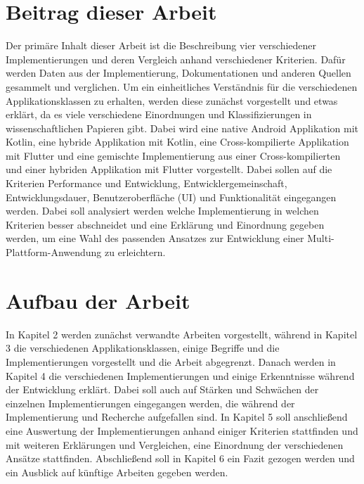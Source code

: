 \section{Beitrag dieser Arbeit}
Der primäre Inhalt dieser Arbeit ist die Beschreibung vier verschiedener Implementierungen und deren Vergleich anhand verschiedener Kriterien. Dafür werden Daten aus der Implementierung, Dokumentationen und anderen Quellen gesammelt und verglichen.
Um ein einheitliches Verständnis für die verschiedenen Applikationsklassen zu erhalten, werden diese zunächst vorgestellt und etwas erklärt, da es viele verschiedene Einordnungen und Klassifizierungen in wissenschaftlichen Papieren gibt.
Dabei wird eine native Android Applikation mit Kotlin, eine hybride Applikation mit Kotlin, eine Cross-kompilierte Applikation mit Flutter und eine gemischte Implementierung aus einer Cross-kompilierten und einer hybriden Applikation mit Flutter vorgestellt. 
Dabei sollen auf die Kriterien Performance und Entwicklung, Entwicklergemeinschaft, Entwicklungsdauer, Benutzeroberfläche (UI) und Funktionalität eingegangen werden. Dabei soll analysiert werden welche Implementierung in welchen Kriterien besser abschneidet und eine Erklärung und Einordnung gegeben werden, um eine Wahl des passenden Ansatzes zur Entwicklung einer Multi-Plattform-Anwendung zu erleichtern.


\section{Aufbau der Arbeit}
In Kapitel 2 werden zunächst verwandte Arbeiten vorgestellt, während in Kapitel 3 die verschiedenen Applikationsklassen, einige Begriffe und die Implementierungen vorgestellt und die Arbeit abgegrenzt.
Danach werden in Kapitel 4 die verschiedenen Implementierungen und einige Erkenntnisse während der Entwicklung erklärt. Dabei soll auch auf Stärken und Schwächen der einzelnen Implementierungen eingegangen werden, die während der Implementierung und Recherche aufgefallen sind.
In Kapitel 5 soll anschließend eine Auswertung der Implementierungen anhand einiger Kriterien stattfinden und mit weiteren Erklärungen und Vergleichen, eine Einordnung der verschiedenen Ansätze stattfinden. Abschließend soll in Kapitel 6 ein Fazit gezogen werden und ein Ausblick auf künftige Arbeiten gegeben werden.